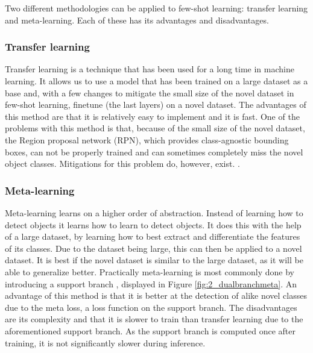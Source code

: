 Two different methodologies can be applied to few-shot learning: transfer learning and meta-learning. Each of these has its advantages and disadvantages. %

\subsubsection*{Transfer learning}

Transfer learning is a technique that has been used for a long time in machine learning. It allows us to use a model that has been trained on a large dataset as a base and, with a few changes to mitigate the small size of the novel dataset in few-shot learning, finetune (the last layers) on a novel dataset. The advantages of this method are that it is relatively easy to implement and it is fast. One of the problems with this method is that, because of the small size of the novel dataset, the Region proposal network (RPN), which provides class-agnostic bounding boxes, can not be properly trained and can sometimes completely miss the novel object classes. Mitigations for this problem do, however, exist. \cite{DBLP:journals/corr/abs-2011-10142, VU2022104398, DBLP:journals/corr/abs-2105-09491, DBLP:journals/corr/abs-2103-05950,rs14143255}.

\subsubsection*{Meta-learning}

Meta-learning learns on a higher order of abstraction. Instead of learning how to detect objects it learns how to learn to detect objects. It does this with the help of a large dataset, by learning how to best extract and differentiate the features of its classes. Due to the dataset being large, this can then be applied to a novel dataset. It is best if the novel dataset is similar to the large dataset, as it will be able to generalize better. Practically meta-learning is most commonly done by introducing a support branch \cite{few-shot-comprehensive-survey}, displayed in Figure \ref{fig:2_dualbranchmeta}. An advantage of this method is that it is better at the detection of alike novel classes due to the meta loss, a loss function on the support branch. %
The disadvantages are its complexity and that it is slower to train than transfer learning due to the aforementioned support branch. As the support branch is computed once after training, it is not significantly slower during inference.


